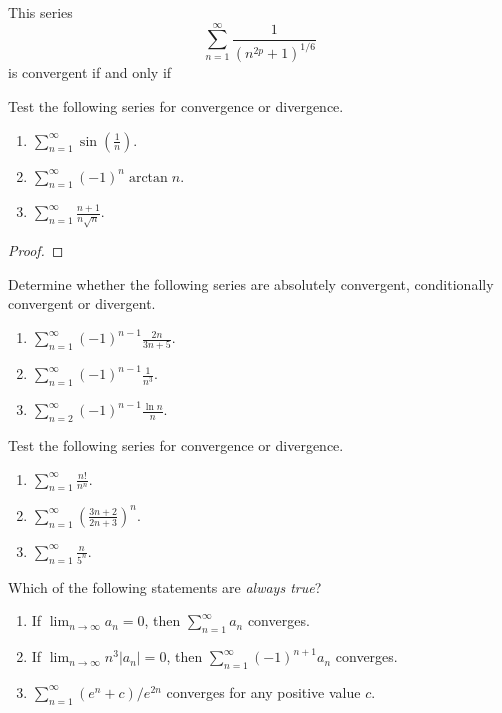 \begin{problem}
This series
\[
\sum_{n=1}^\infty\frac{1}{({n^{2p}+1})^{1/6}}
\]
is convergent if and only if
\end{problem}
\begin{problem}
Test the following series for convergence or divergence.
\begin{enumerate}[label=(\alph*)]
\item $\displaystyle\sum_{n=1}^\infty \sin\left(\frac{1}{n}\right)$.
\item $\displaystyle\sum_{n=1}^\infty(-1)^n\arctan n$.
\item $\displaystyle\sum_{n=1}^\infty\frac{n+1}{n\sqrt{n}}$.
\end{enumerate}
\end{problem}
\begin{proof}

\end{proof}
\begin{problem}
Determine whether the following series are absolutely convergent,
conditionally convergent or divergent.
\begin{enumerate}[label=(\alph*)]
\item $\displaystyle\sum_{n=1}^\infty(-1)^{n-1}\frac{2n}{3n+5}$.
\item $\displaystyle\sum_{n=1}^\infty(-1)^{n-1}\frac{1}{n^3}$.
\item $\displaystyle\sum_{n=2}^\infty(-1)^{n-1}\frac{\ln n}{n}$.
\end{enumerate}
\end{problem}
\begin{problem}
Test the following series for convergence or divergence.
\begin{enumerate}[label=(\alph*)]
\item $\displaystyle\sum_{n=1}^\infty\frac{n!}{n^n}$.
\item $\displaystyle\sum_{n=1}^\infty\left(\frac{3n+2}{2n+3}\right)^n$.
\item $\displaystyle\sum_{n=1}^\infty\frac{n}{5^n}$.
\end{enumerate}
\end{problem}
\begin{problem}
Which of the following statements are \emph{always true}?
\begin{enumerate}[label=(\MakeUppercase{\roman*})]
\item If $\lim_{n\to\infty} a_n=0$, then $\sum_{n=1}^\infty a_n$
  converges.
\item If $\lim_{n\to\infty} n^3|a_n|=0$, then
  $\sum_{n=1}^\infty(-1)^{n+1}a_n$ converges.
\item $\sum_{n=1}^\infty (e^n+c)/e^{2n}$ converges for any positive value
  $c$.
\end{enumerate}
\end{problem}
